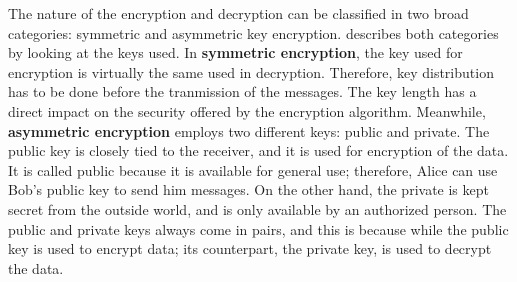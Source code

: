 The nature of the encryption and decryption can be classified in two broad categories: symmetric and asymmetric key encryption. \cite{CryptoKeys} describes both categories by looking at the keys used. In \textbf{symmetric encryption}, the key used for encryption is virtually the same used in decryption. Therefore, key distribution has to be done before the tranmission of the messages. The key length has a direct impact on the security offered by the encryption algorithm. Meanwhile, \textbf{asymmetric encryption} employs two different keys: public and private. The public key is closely tied to the receiver, and it is used for encryption of the data. It is called public because it is available for general use; therefore, Alice can use Bob's public key to send him messages. On the other hand, the private is kept secret from the outside world, and is only available by an authorized person. The public and private keys always come in pairs, and this is because while the public key is used to encrypt data; its counterpart, the private key, is used to decrypt the data. 



\clearpage
